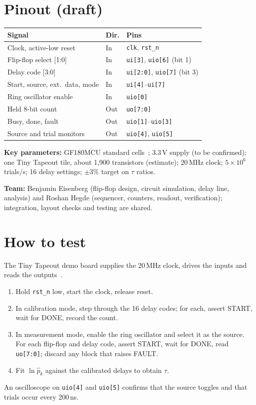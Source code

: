 \documentclass[10pt]{article}
\begin{document}
\noindent\begin{minipage}[t]{0.53\linewidth}
\section{Pinout (draft)}
{\footnotesize
\begin{tabularx}{\linewidth}{@{}X l l@{}}
\toprule
Signal & Dir. & Pins \\
\midrule
Clock, active-low reset & In & \texttt{clk}, \texttt{rst\_n} \\
Flip-flop select [1:0] & In & \texttt{ui[3]}, \texttt{uio[6]} (bit 1) \\
Delay code [3:0] & In & \texttt{ui[2:0]}, \texttt{uio[7]} (bit 3) \\
Start, source, ext.\ data, mode & In & \texttt{ui[4]}--\texttt{ui[7]} \\
Ring oscillator enable & In & \texttt{uio[0]} \\
Held 8-bit count & Out & \texttt{uo[7:0]} \\
Busy, done, fault & Out & \texttt{uio[1]}--\texttt{uio[3]} \\
Source and trial monitors & Out & \texttt{uio[4]}, \texttt{uio[5]} \\
\bottomrule
\end{tabularx}}
\par\vspace{5pt}
{\small \textbf{Key parameters:} GF180MCU standard cells~\cite{pdk}; 3.3\,V supply (to be confirmed); one Tiny Tapeout tile, about
1{,}900 transistors (estimate); 20\,MHz clock; $5\times10^{6}$ trials/s; 16 delay settings; $\pm3\%$ target on $\tau$ ratios.\par\vspace{2pt}
\textbf{Team:} Benjamin Eisenberg (flip-flop design, circuit simulation, delay line, analysis) and Roshan Hegde
(sequencer, counters, readout, verification); integration, layout checks and testing are shared.}
\end{minipage}\hfill
\begin{minipage}[t]{0.43\linewidth}
\section{How to test}
The Tiny Tapeout demo board supplies the 20\,MHz clock, drives the inputs and reads the outputs~\cite{tt}.
\begin{enumerate}
\item Hold \texttt{rst\_n} low, start the clock, release reset.
\item In calibration mode, step through the 16 delay codes; for each, assert START, wait for DONE, record the count.
\item In measurement mode, enable the ring oscillator and select it as the source. For each flip-flop and delay code,
  assert START, wait for DONE, read \texttt{uo[7:0]}; discard any block that raises FAULT.
\item Fit $\ln \hat{p}_k$ against the calibrated delays to obtain $\tau$.
\end{enumerate}
An oscilloscope on \texttt{uio[4]} and \texttt{uio[5]} confirms that the source toggles and that trials occur every
200\,ns.
\end{minipage}
\end{document}
